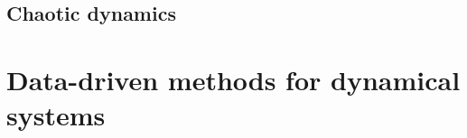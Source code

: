 \documentclass[11pt, fleqn]{book} %
\begin{document}








\chapter{Chaotic dynamics}











\part{Data-driven methods for dynamical systems}





\end{document}

